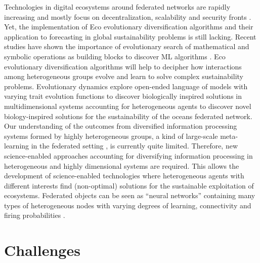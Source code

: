 \documentclass[12pt,a4paper]{article}
\begin{document}
Technologies in digital ecosystems around federated networks are rapidly increasing and mostly focus on decentralization, scalability and security fronts \cite{Androulaki2018,OceanProtocolFoundation2018,BigchainDBGmbH2018}. Yet, the implementation of Eco evolutionary diversification algorithms and their application to forecasting in global sustainability problems is still lacking. Recent studies have shown the importance of evolutionary search of mathematical and symbolic operations as building blocks to discover ML algorithms \citep{Real2020,Guimera2020}. Eco evolutionary diversification algorithms will help to decipher how interactions among heterogeneous groups evolve and learn to solve complex sustainability problems. Evolutionary dynamics explore open-ended language of models with varying trait evolution functions to discover biologically inspired solutions in multidimensional systems \citep{Real2020} accounting for heterogeneous agents to discover novel biology-inspired solutions for the sustainability of the oceans federated network.
Our understanding of the outcomes from diversified information processing systems formed by highly heterogeneous groups, a kind of large-scale meta-learning in the federated setting \citep{Dilley2016}, is currently quite limited. Therefore, new science-enabled approaches accounting for diversifying information processing in heterogeneous and highly dimensional systems are required. This allows the development of science-enabled technologies where heterogeneous agents with different interests find (non-optimal) solutions for the sustainable exploitation of ecosystems. Federated objects can be seen as ``neural networks'' containing many types of heterogeneous nodes with varying degrees of learning, connectivity and firing probabilities \citep{Maass2014,Maass2015}.

\section{Challenges}
\end{document}
